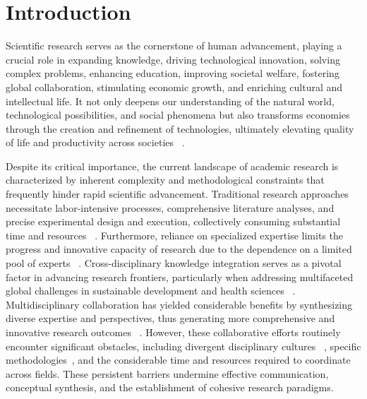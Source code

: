 \section*{Introduction}


Scientific research serves as the cornerstone of human advancement, playing a crucial role in expanding knowledge, driving technological innovation, solving complex problems, enhancing education, improving societal welfare, fostering global collaboration, stimulating economic growth, and enriching cultural and intellectual life. It not only deepens our understanding of the natural world, technological possibilities, and social phenomena but also transforms economies through the creation and refinement of technologies, ultimately elevating quality of life and productivity across societies ~\cite{gibbons1974roles, sciencenoy2023experimental}. 


Despite its critical importance, the current landscape of academic research is characterized by inherent complexity and methodological constraints that frequently hinder rapid scientific advancement. Traditional research approaches necessitate labor-intensive processes, comprehensive literature analyses, and precise experimental design and execution, collectively consuming substantial time and resources ~\cite{rossoni2023barriers, vamathevan2019applications}. Furthermore, reliance on specialized expertise limits the progress and innovative capacity of research due to the dependence on a limited pool of experts ~\cite{Fabrykowska2020}. Cross-disciplinary knowledge integration serves as a pivotal factor in advancing research frontiers, particularly when addressing multifaceted global challenges in sustainable development and health sciences ~\cite{daniel2022challenges, freeth2020learning}. Multidisciplinary collaboration has yielded considerable benefits by synthesizing diverse expertise and perspectives, thus generating more comprehensive and innovative research outcomes ~\cite{toner2024artificial}. However, these collaborative efforts routinely encounter significant obstacles, including divergent disciplinary cultures ~\cite{daniel2022challenges}, specific methodologies~\cite{macleod2018makes}, and the considerable time and resources required to coordinate across fields. These persistent barriers undermine effective communication, conceptual synthesis, and the establishment of cohesive research paradigms.

